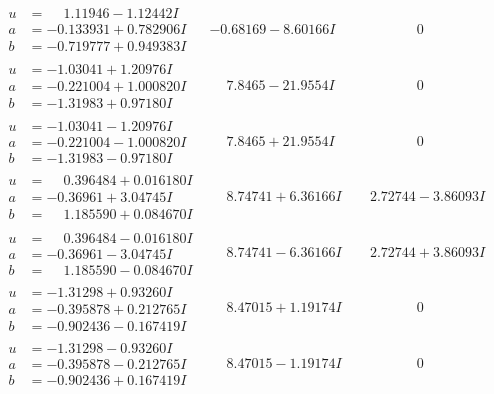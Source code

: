 \documentclass[1p]{elsarticle_modified}
\theoremstyle{definition}
\begin{document}
$$\begin{array}{c|c|c}
\begin{aligned}
u &= \phantom{-}1.11946 - 1.12442 I \\
a &= -0.133931 + 0.782906 I \\
b &= -0.719777 + 0.949383 I\end{aligned}
 & -0.68169 - 8.60166 I & \phantom{-0.000000 } 0 \\ \hline\begin{aligned}
u &= -1.03041 + 1.20976 I \\
a &= -0.221004 + 1.000820 I \\
b &= -1.31983 + 0.97180 I\end{aligned}
 & \phantom{-}7.8465 - 21.9554 I & \phantom{-0.000000 } 0 \\ \hline\begin{aligned}
u &= -1.03041 - 1.20976 I \\
a &= -0.221004 - 1.000820 I \\
b &= -1.31983 - 0.97180 I\end{aligned}
 & \phantom{-}7.8465 + 21.9554 I & \phantom{-0.000000 } 0 \\ \hline\begin{aligned}
u &= \phantom{-}0.396484 + 0.016180 I \\
a &= -0.36961 + 3.04745 I \\
b &= \phantom{-}1.185590 + 0.084670 I\end{aligned}
 & \phantom{-}8.74741 + 6.36166 I & \phantom{-}2.72744 - 3.86093 I \\ \hline\begin{aligned}
u &= \phantom{-}0.396484 - 0.016180 I \\
a &= -0.36961 - 3.04745 I \\
b &= \phantom{-}1.185590 - 0.084670 I\end{aligned}
 & \phantom{-}8.74741 - 6.36166 I & \phantom{-}2.72744 + 3.86093 I \\ \hline\begin{aligned}
u &= -1.31298 + 0.93260 I \\
a &= -0.395878 + 0.212765 I \\
b &= -0.902436 - 0.167419 I\end{aligned}
 & \phantom{-}8.47015 + 1.19174 I & \phantom{-0.000000 } 0 \\ \hline\begin{aligned}
u &= -1.31298 - 0.93260 I \\
a &= -0.395878 - 0.212765 I \\
b &= -0.902436 + 0.167419 I\end{aligned}
 & \phantom{-}8.47015 - 1.19174 I & \phantom{-0.000000 } 0 \\ \hline\begin{aligned}

\end{aligned}
\end{array}$$
\end{document}
